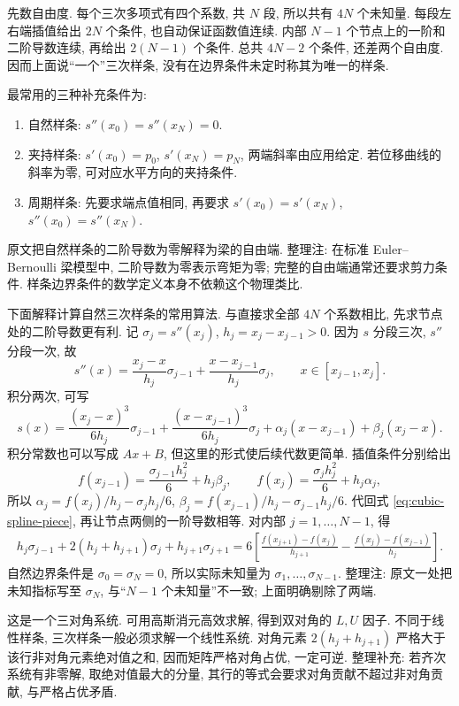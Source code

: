 先数自由度. 每个三次多项式有四个系数, 共 $N$ 段, 所以共有 $4N$ 个未知量. 每段左右端插值给出 $2N$ 个条件, 也自动保证函数值连续. 内部 $N-1$ 个节点上的一阶和二阶导数连续, 再给出 $2(N-1)$ 个条件. 总共 $4N-2$ 个条件, 还差两个自由度. 因而上面说“一个”三次样条, 没有在边界条件未定时称其为唯一的样条.

最常用的三种补充条件为:
\begin{enumerate}
\item 自然样条: $s''(x_0)=s''(x_N)=0$.
\item 夹持样条: $s'(x_0)=p_0$, $s'(x_N)=p_N$, 两端斜率由应用给定. 若位移曲线的斜率为零, 可对应水平方向的夹持条件.
\item 周期样条: 先要求端点值相同, 再要求 $s'(x_0)=s'(x_N)$, $s''(x_0)=s''(x_N)$.
\end{enumerate}
原文把自然样条的二阶导数为零解释为梁的自由端. 整理注: 在标准 Euler--Bernoulli 梁模型中, 二阶导数为零表示弯矩为零; 完整的自由端通常还要求剪力条件. 样条边界条件的数学定义本身不依赖这个物理类比.

下面解释计算自然三次样条的常用算法. 与直接求全部 $4N$ 个系数相比, 先求节点处的二阶导数更有利. 记 $\sigma_j=s''(x_j)$, $h_j=x_j-x_{j-1}>0$. 因为 $s$ 分段三次, $s''$ 分段一次, 故
\[
s''(x)=\frac{x_j-x}{h_j}\sigma_{j-1}+\frac{x-x_{j-1}}{h_j}\sigma_j,
\qquad x\in[x_{j-1},x_j].
\]
积分两次, 可写
\begin{equation}\label{eq:cubic-spline-piece}
s(x)=\frac{(x_j-x)^3}{6h_j}\sigma_{j-1}
+\frac{(x-x_{j-1})^3}{6h_j}\sigma_j
+\alpha_j(x-x_{j-1})+\beta_j(x_j-x).
\end{equation}
积分常数也可以写成 $Ax+B$, 但这里的形式使后续代数更简单. 插值条件分别给出
\[
f(x_{j-1})=\frac{\sigma_{j-1}h_j^2}{6}+h_j\beta_j,\qquad
f(x_j)=\frac{\sigma_jh_j^2}{6}+h_j\alpha_j,
\]
所以 $\alpha_j=f(x_j)/h_j-\sigma_jh_j/6$, $\beta_j=f(x_{j-1})/h_j-\sigma_{j-1}h_j/6$. 代回式 \eqref{eq:cubic-spline-piece}, 再让节点两侧的一阶导数相等. 对内部 $j=1,\ldots,N-1$, 得
\begin{equation}\label{eq:spline-tridiagonal}
\begin{split}
h_j\sigma_{j-1}+2(h_j+h_{j+1})\sigma_j+h_{j+1}\sigma_{j+1}
=6\left[\frac{f(x_{j+1})-f(x_j)}{h_{j+1}}
-\frac{f(x_j)-f(x_{j-1})}{h_j}\right].
\end{split}
\end{equation}
自然边界条件是 $\sigma_0=\sigma_N=0$, 所以实际未知量为 $\sigma_1,\ldots,\sigma_{N-1}$. 整理注: 原文一处把未知指标写至 $\sigma_N$, 与“$N-1$ 个未知量”不一致; 上面明确剔除了两端.

这是一个三对角系统. 可用高斯消元高效求解, 得到双对角的 $L,U$ 因子. 不同于线性样条, 三次样条一般必须求解一个线性系统. 对角元素 $2(h_j+h_{j+1})$ 严格大于该行非对角元素绝对值之和, 因而矩阵严格对角占优, 一定可逆. 整理补充: 若齐次系统有非零解, 取绝对值最大的分量, 其行的等式会要求对角贡献不超过非对角贡献, 与严格占优矛盾.

